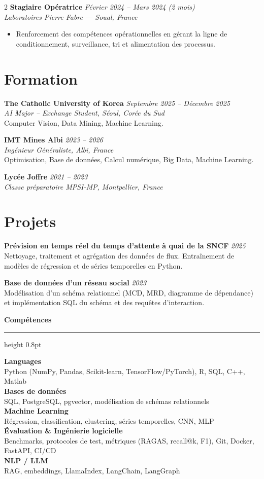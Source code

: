 \documentclass[10.5pt,a4paper]{article}
\newcommand{\sectionrule}{\vspace{-6pt}{\color{accent}\hrule height 1pt}\vspace{3pt}}
\newcommand{\subsectitle}[1]{%
  {\color{accent}\bfseries\large #1}\\[-2pt]
  {\color{accent}\hrule height 0.8pt}\vspace{4pt}
}
\newcommand{\cvexp}[5]{%
  \noindent\textbf{#1} \hfill {\itshape\color{graytext}\small #4}\\
  {\itshape #2 --- #3}\\[-2pt]
  #5
  \vspace{5pt}
}
\newcommand{\cvedu}[5]{%
  \noindent\textbf{#1} \hfill {\itshape\color{graytext}\small #4}\\
  {\itshape #2, #3}\\[1pt]
  {\small #5}
  \vspace{2pt}
}
\newcommand{\cveduplain}[4]{%
  \noindent\textbf{#1} \hfill {\itshape\color{graytext}\small #4}\\
  {\itshape #2, #3}
  \vspace{2pt}
}
\newcommand{\cvproject}[3]{%
  \noindent\textbf{#1} \hfill {\itshape\color{graytext}\small #2}\\[1pt]
  {\small #3}
  \vspace{3pt}
}
\newcommand{\sidebarline}[2]{%
  \noindent\textbf{\small #1}\\
  {\small #2}\\[3pt]
}
\begin{document}
\begin{paracol}{2}
\cvexp{Stagiaire Opératrice}{Laboratoires Pierre Fabre}{Soual, France}{Février 2024 -- Mars 2024 (2 mois)}{%
  \begin{itemize}[leftmargin=12pt, itemsep=2pt, topsep=0pt, partopsep=0pt, parsep=0pt]
    \item Renforcement des compétences opérationnelles en gérant la ligne de conditionnement, surveillance, tri et alimentation des processus.
  \end{itemize}
}

\section*{Formation}
\sectionrule

\cvedu{The Catholic University of Korea}{AI Major -- Exchange Student}{Séoul, Corée du Sud}{Septembre 2025 -- Décembre 2025}{Computer Vision, Data Mining, Machine Learning.}

\cvedu{IMT Mines Albi}{Ingénieur Généraliste}{Albi, France}{2023 -- 2026}{Optimisation, Base de données, Calcul numérique, Big Data, Machine Learning.}

\cveduplain{Lycée Joffre}{Classe préparatoire MPSI-MP}{Montpellier, France}{2021 -- 2023}

\section*{Projets}
\sectionrule

\cvproject{Prévision en temps réel du temps d'attente à quai de la SNCF}{2025}{Nettoyage, traitement et agrégation des données de flux. Entraînement de modèles de régression et de séries temporelles en Python.}

\cvproject{Base de données d'un réseau social}{2023}{Modélisation d'un schéma relationnel (MCD, MRD, diagramme de dépendance) et implémentation SQL du schéma et des requêtes d'interaction.}

\switchcolumn

\vspace{2pt}

\subsectitle{Compétences}

\sidebarline{Languages}{Python (NumPy, Pandas, Scikit-learn, TensorFlow/\allowbreak PyTorch), R, SQL, C++, Matlab}
\sidebarline{Bases de données}{SQL, PostgreSQL, pgvector, modélisation de schémas relationnels}
\sidebarline{Machine Learning}{Régression, classification, clustering, séries temporelles, CNN, MLP}
\sidebarline{Évaluation \& Ingénierie logicielle}{Benchmarks, protocoles de test, métriques (RAGAS, recall@k, F1), Git, Docker, FastAPI, CI/CD}
\sidebarline{NLP / LLM}{RAG, embeddings, LlamaIndex, LangChain, LangGraph}


\end{paracol}
\end{document}

